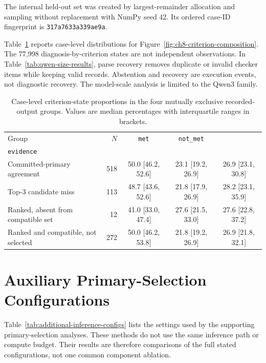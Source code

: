 The internal held-out set was created by largest-remainder allocation and sampling without replacement with NumPy seed 42. Its ordered case-ID fingerprint is \texttt{317a7633a339ae9a}.

Table~\ref{tab:ch8-criterion-ratios} reports case-level distributions for Figure~\ref{fig:ch8-criterion-composition}. The 77,998 diagnosis-by-criterion states are not independent observations. In Table~\ref{tab:qwen-size-results}, parse recovery removes duplicate or invalid checker items while keeping valid records. Abstention and recovery are execution events, not diagnostic recovery. The model-scale analysis is limited to the Qwen3 family.

\begin{table}[htbp]
\centering
\caption{Case-level criterion-state proportions in the four mutually exclusive recorded-output groups. Values are median percentages with interquartile ranges in brackets.}
\label{tab:ch8-criterion-ratios}
\small
\setlength{\tabcolsep}{4pt}
\renewcommand{\arraystretch}{1.08}
\begin{tabularx}{\textwidth}{|X|r|c|c|c|}
\hline
Group & $N$ & \texttt{met} & \texttt{not\_met} & \shortstack{\texttt{insufficient\_}\\\texttt{evidence}}\\
\hline
Committed-primary agreement & 518 & 50.0 [46.2, 52.6] & 23.1 [19.2, 26.9] & 26.9 [23.1, 30.8]\\
\hline
Top-3 candidate miss & 113 & 48.7 [43.6, 52.6] & 21.8 [17.9, 26.9] & 28.2 [23.1, 35.9]\\
\hline
Ranked, absent from compatible set & 12 & 41.0 [33.0, 47.4] & 27.6 [21.5, 33.0] & 27.6 [22.8, 37.2]\\
\hline
Ranked and compatible, not selected & 272 & 50.0 [46.2, 53.8] & 21.8 [19.2, 26.9] & 26.9 [21.8, 32.1]\\
\hline
\end{tabularx}
\renewcommand{\arraystretch}{1.0}
\end{table}

\section{Auxiliary Primary-Selection Configurations}

Table~\ref{tab:additional-inference-configs} lists the settings used by the supporting primary-selection analyses. These methods do not use the same inference path or compute budget. Their results are therefore comparisons of the full stated configurations, not one common component ablation.

